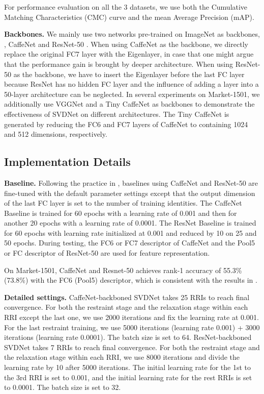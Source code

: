 \documentclass[10pt,twocolumn,letterpaper]{article}
\begin{document}
For performance evaluation on all the 3 datasets, we use both the Cumulative Matching Characteristics (CMC) curve and the mean Average Precision (mAP). 


\textbf{Backbones.} We mainly use two networks pre-trained on ImageNet \cite{DBLP:conf/cvpr/DengDSLL009} as backbones, \ie, CaffeNet \cite{DBLP:conf/nips/KrizhevskySH12} and ResNet-50 \cite{DBLP:conf/cvpr/HeZRS16}. 
When using CaffeNet as the backbone, we directly replace the original FC7 layer with the Eigenlayer, in case that one might argue that the performance gain is brought by deeper architecture. When using ResNet-50 as the backbone, we have to insert the Eigenlayer before the last FC layer because ResNet has no hidden FC layer and the influence of adding a layer into a 50-layer architecture can be neglected.
In several experiments on Market-1501, we additionally use  VGGNet \cite{simonyan2014very} and a Tiny CaffeNet as backbones to demonstrate the effectiveness of SVDNet on different architectures. The Tiny CaffeNet is generated by reducing the FC6 and FC7 layers of CaffeNet to containing 1024 and 512 dimensions, respectively.

\subsection{Implementation Details}\label{sec:details}
\textbf{Baseline.} Following the practice in \cite{DBLP:journals/corr/ZhengYH16}, baselines using CaffeNet and ResNet-50 are fine-tuned with the default parameter settings except that the output dimension of the last FC layer is set to the number of training identities. The CaffeNet Baseline is trained for 60 epochs with a learning rate of 0.001 and then for another 20 epochs with a learning rate of 0.0001. The ResNet Baseline is trained for 60 epochs with learning rate initialized at 0.001 and reduced by 10 on 25 and 50 epochs. During testing, the FC6 or FC7 descriptor of CaffeNet and the Pool5 or FC descriptor of ResNet-50 are used for feature representation.

On Market-1501, CaffeNet and Resnet-50 achieves rank-1 accuracy of 55.3\% (73.8\%) with the FC6 (Pool5) descriptor, which is consistent with the results in \cite{DBLP:journals/corr/ZhengYH16}.

\textbf{Detailed settings.} 
CaffeNet-backboned SVDNet takes 25 RRIs to reach final convergence. For both the restraint stage and the relaxation stage within each RRI except the last one, we use 2000 iterations and fix the learning rate at 0.001. For the last restraint training, we use 5000 iterations (learning rate 0.001) + 3000 iterations (learning rate 0.0001). The batch size is set to 64. ResNet-backboned SVDNet takes 7 RRIs to reach final convergence. For both the restraint stage and the relaxation stage within each RRI, we use 8000 iterations and divide the learning rate by 10 after 5000 iterations. The initial learning rate for the 1st to the 3rd RRI is set to 0.001, and the initial learning rate for the rest RRIs is set to 0.0001. The batch size is set to 32.
\end{document}
